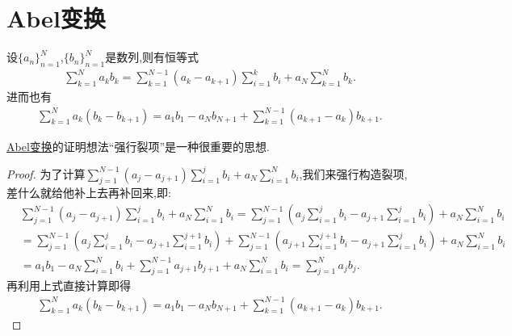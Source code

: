 \documentclass[../../main.tex]{subfiles}%
\begin{document}
\section{Abel变换}

\begin{theorem}[Abel变换]\label{theorem:Abel变换}
设\(\{a_n\}_{n = 1}^{N}\),\(\{b_n\}_{n = 1}^{N}\)是数列,则有恒等式
\begin{align*}
\sum\limits_{k = 1}^{N} a_k b_k = \sum\limits_{k = 1}^{N - 1} (a_k - a_{k + 1}) \sum\limits_{i = 1}^{k} b_i + a_N \sum\limits_{k = 1}^{N} b_k.
\end{align*}
进而也有
\begin{align*}
\sum_{k=1}^N{a_k\left( b_k-b_{k+1} \right)}=a_1b_1-a_Nb_{N+1}+\sum_{k=1}^{N-1}{\left( a_{k+1}-a_k \right) b_{k+1}}.
\end{align*}
\end{theorem}
\begin{note}
\hyperref[theorem:Abel变换]{Abel变换}的证明想法“强行裂项”是一种很重要的思想.
\end{note}
\begin{proof}

为了计算\(\sum\limits_{j = 1}^{N - 1} (a_j - a_{j + 1}) \sum\limits_{i = 1}^{j} b_i + a_N \sum\limits_{i = 1}^{N} b_i\),我们来强行构造裂项,差什么就给他补上去再补回来,即:
\begin{align*}
&\sum\limits_{j = 1}^{N - 1} (a_j - a_{j + 1}) \sum\limits_{i = 1}^{j} b_i + a_N \sum\limits_{i = 1}^{N} b_i = \sum\limits_{j = 1}^{N - 1} \left(a_j \sum\limits_{i = 1}^{j} b_i - a_{j + 1} \sum\limits_{i = 1}^{j} b_i\right) + a_N \sum\limits_{i = 1}^{N} b_i
\\
&= \sum\limits_{j = 1}^{N - 1} \left(a_j \sum\limits_{i =1}^{j} b_i - a_{j + 1} \sum\limits_{i = 1}^{j + 1} b_i\right) + \sum\limits_{j = 1}^{N - 1} \left(a_{j + 1} \sum\limits_{i = 1}^{j + 1} b_i - a_{j + 1} \sum\limits_{i = 1}^{j} b_i\right) + a_N \sum\limits_{i = 1}^{N} b_i
\\
&= a_1 b_1 - a_N \sum\limits_{i = 1}^{N} b_i + \sum\limits_{j = 1}^{N - 1} a_{j + 1} b_{j + 1} + a_N \sum\limits_{i = 1}^{N} b_i
= \sum\limits_{j = 1}^{N} a_j b_j.
\end{align*}
再利用上式直接计算即得
\begin{align*}
\sum_{k=1}^N{a_k\left( b_k-b_{k+1} \right)}=a_1b_1-a_Nb_{N+1}+\sum_{k=1}^{N-1}{\left( a_{k+1}-a_k \right) b_{k+1}}.
\end{align*}

\end{proof}
\end{document}
